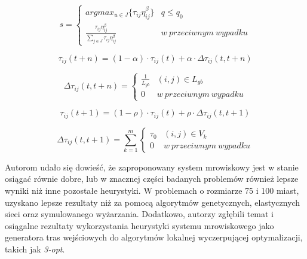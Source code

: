 {{{            \begin{equation}\label{eqt:ant_colony_dispatch}
                s = \left\{
                        \begin{matrix}
                            argmax_{u \in J} \{\tau_{ij}\eta_{ij}^\beta\} & q \leq q_0\\
                            \frac{\tau_{ij} \eta_{ij}^\beta}{\sum_{j\in J} {\tau_{ij} \eta_{ij}^\beta} } & w\ przeciwnym\ wypadku
                        \end{matrix}
                    \right.
            \end{equation}

            \begin{equation}\label{eqt:ant_colony_global_update_1}
                \tau_{ij}(t + n) = (1 - \alpha) \cdot \tau_{ij}(t) + \alpha \cdot \Delta\tau_{ij}(t, t + n)
            \end{equation}

            \begin{equation}\label{eqt:ant_colony_global_update_2}
                \Delta\tau_{ij}(t, t + n) = \left\{
                    \begin{matrix}
                        \frac{1}{L_{gb}} & (i, j) \in L_{gb} \\
                        0 & w\ przeciwnym\ wypadku
                    \end{matrix}
                \right.
            \end{equation}

            \begin{equation}\label{eqt:ant_colony_local_update_1}
                \tau_{ij}(t + 1) = (1 - \rho) \cdot \tau_{ij}(t) + \rho \cdot \Delta\tau_{ij}(t, t + 1)
            \end{equation}

            \begin{equation}\label{eqt:ant_colony_local_update_2}
                \Delta\tau_{ij}(t, t + 1) = \sum_{k=1}^m \left\{
                    \begin{matrix}
                        \tau_0 & (i, j) \in V_k \\
                        0 & w\ przeciwnym\ wypadku
                    \end{matrix}
                \right.
            \end{equation}

            Autorom udało się dowieść, że zaproponowany system mrowiskowy jest w stanie osiągać równie dobre, lub w
            znacznej części badanych problemów również lepsze wyniki niż inne pozostałe heurystyki. W problemach o
            rozmiarze 75 i 100 miast, uzyskano lepsze rezultaty niż za pomocą algorytmów genetycznych, elastycznych
            sieci oraz symulowanego wyżarzania. Dodatkowo, autorzy zgłębili temat i osiągalne rezultaty wykorzystania
            heurystyki systemu mrowiskowego jako generatora tras wejściowych do algorytmów lokalnej wyczerpującej
            optymalizacji, takich jak \textit{3-opt}.
        }

}}
